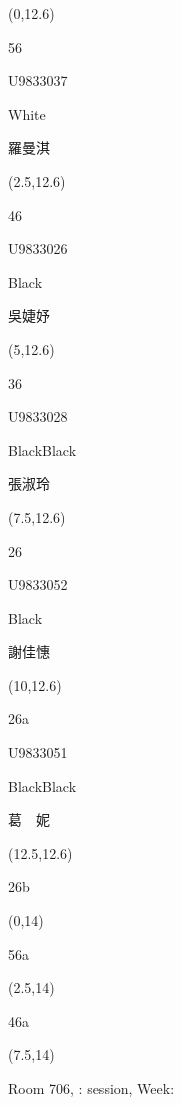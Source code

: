 \documentclass[a4paper]{article}
\newcommand{\myseat}[5]{%
\vspace{-0.1cm}
\parbox[t][2.2cm][t]{3.5cm}{
\small #1 %
\begin{description}
\vspace{-0.1cm}
\item [ID:] #2
\vspace{-0.1cm}
\item [Team:] #3 \normalsize
\vspace{-0.1cm}
\item \normalsize #4 #5
\vspace{-0.1cm}
\end{description}
}
}
\begin{document}
\begin{CJK}{UTF8}{cyberbit}
\begin{textblock}{2.5}(0,12.6)
\myseat{56}{U9833037}{White}{羅曼淇}{}
\end{textblock}

\begin{textblock}{2.5}(2.5,12.6)
\myseat{46}{U9833026}{Black}{吳婕妤}{}
\end{textblock}

\begin{textblock}{2.5}(5,12.6)
\myseat{36}{U9833028}{BlackBlack}{張淑玲}{}
\end{textblock}

\begin{textblock}{2.5}(7.5,12.6)
\myseat{26}{U9833052}{Black}{謝佳憓}{}
\end{textblock}

\begin{textblock}{2.5}(10,12.6)
\myseat{26a}{U9833051}{BlackBlack}{葛　妮}{}
\end{textblock}

\begin{textblock}{2.5}(12.5,12.6)
\textblockcolor{}
\myseat{26b}{}{}{}{}
\end{textblock}

\begin{textblock}{2.5}(0,14)
\textblockcolor{}
\myseat{56a}{}{}{}{}
\end{textblock}

\begin{textblock}{2.5}(2.5,14)
\textblockcolor{}
\myseat{46a}{}{}{}{}
\end{textblock}

\begin{textblock}{7.5}(7.5,14)
\textblockcolor{}
\parbox[t][2.2cm][t]{9.5cm}{%
\large Room 706, :  session, Week: 
}
\end{textblock}

\end{CJK}
\end{document}
